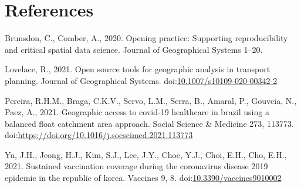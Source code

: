\documentclass[]{elsarticle} %
\begin{document}
\hypertarget{references}{%
\section*{References}\label{references}}

\hypertarget{refs}{}
\leavevmode\hypertarget{ref-Brunsdon2020opening}{}%
Brunsdon, C., Comber, A., 2020. Opening practice: Supporting
reproducibility and critical spatial data science. Journal of
Geographical Systems 1--20.

\leavevmode\hypertarget{ref-Lovelace2021open}{}%
Lovelace, R., 2021. Open source tools for geographic analysis in
transport planning. Journal of Geographical Systems.
doi:\href{https://doi.org/10.1007/s10109-020-00342-2}{10.1007/s10109-020-00342-2}

\leavevmode\hypertarget{ref-Pereira2021geographic}{}%
Pereira, R.H.M., Braga, C.K.V., Servo, L.M., Serra, B., Amaral, P.,
Gouveia, N., Paez, A., 2021. Geographic access to covid-19 healthcare in
brazil using a balanced float catchment area approach. Social Science \&
Medicine 273, 113773.
doi:\href{https://doi.org/https://doi.org/10.1016/j.socscimed.2021.113773}{https://doi.org/10.1016/j.socscimed.2021.113773}

\leavevmode\hypertarget{ref-Yu2021sustained}{}%
Yu, J.H., Jeong, H.J., Kim, S.J., Lee, J.Y., Choe, Y.J., Choi, E.H.,
Cho, E.H., 2021. Sustained vaccination coverage during the coronavirus
disease 2019 epidemic in the republic of korea. Vaccines 9, 8.
doi:\href{https://doi.org/10.3390/vaccines9010002}{10.3390/vaccines9010002}
\end{document}

